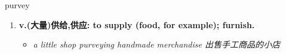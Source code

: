 
\begin{frame}
{\huge purvey}
\begin{center}
\begin{enumerate}\Large
  \item \textbf{v.(大量)供给,供应: to supply (food, for example); furnish.}
  \begin{itemize}
    \item \em{\Large{a little shop purveying handmade merchandise 出售手工商品的小店}}
  \end{itemize}
\end{enumerate}
\end{center}
\end{frame}
